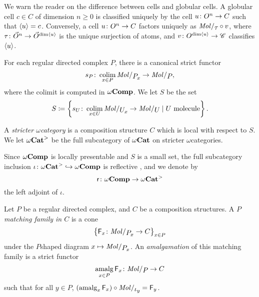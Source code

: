 \begin{rmk}
    We warn the reader on the difference between cells and globular cells. 
    A globular cell \( c \in C \) of dimension \( n \geq 0 \) is classified uniquely by the cell \( u \colon O^{n} \to C \) such that \( \langle u\rangle = c \).
    Conversely, a cell \( u \colon O^{n} \to C \) factors uniquely as \( \molecin{\tau} \after v \), where \( \tau \colon \vec{O}^{n} \to \vec{O}^{\dim \langle u\rangle} \) is the unique surjection of atoms, and \( v \colon O^{\dim \langle u\rangle} \to \mathscr{C} \) classifies \( \langle u\rangle \).
\end{rmk}

\begin{dfn}
    For each regular directed complex \( P \), there is a canonical strict functor
    \begin{equation*}
        s_P \colon \colim_{x \in P} \molecin{\imel{P}{x}} \to \molecin{P},
    \end{equation*}
    where the colimit is computed in \( \omega\mathbf{Comp} \).
    We let \( S \) be the set
    \begin{equation*}
        S \eqdef \set{s_U \colon \colim_{x \in U} \molecin{\imel{U}{x}} \to \molecin{U} \mid U \text{ molecule}}.
    \end{equation*}
\end{dfn}

\begin{dfn}
    A \emph{stricter \( \omega \)\nbd category} is a composition structure \( C \) which is local with respect to \( S \).
    We let \( {\omega\mathbf{Cat}}^> \) be the full subcategory of \( {\omega\mathbf{Cat}} \) on stricter \( \omega \)\nbd categories.
\end{dfn}

\noindent Since \( \omega\mathbf{Comp} \) is locally presentable and \( S \) is a small set, the full subcategory inclusion \( \iota \colon {\omega\mathbf{Cat}}^> \hookrightarrow \omega\mathbf{Comp} \) is reflective \cite{freyd1972continuous}, and we denote by 
\begin{equation*}
    \mathsf{r} \colon \omega\mathbf{Comp} \to {\omega\mathbf{Cat}}^>
\end{equation*}
the left adjoint of \( \iota \).

\begin{dfn} 
    Let \( P \) be a regular directed complex, and \( C \) be a composition structures.
    A \emph{\( P \)\nbd matching family in \( C \)} is a cone 
    \begin{equation*}
        \set{\F_x \colon \molecin{\imel{P}{x}} \to C}_{x \in P}
    \end{equation*}
    under the \( P \)\nbd shaped diagram \( x \mapsto \molecin{\imel{P}{x}} \).    
    An \emph{amalgamation} of this matching family is a strict functor 
    \begin{equation*}
        \amalg_{x\in P} \F_x \colon \molecin{P} \to C
    \end{equation*}
    such that for all \( y \in P \), \( (\amalg_x \F_x) \after \molecin{\mapel{y}} = \F_y \).
\end{dfn}

